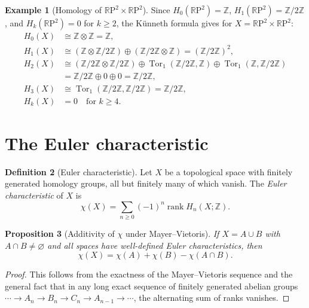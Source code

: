 \documentclass[12pt,a4paper,openany]{book}
\theoremstyle{definition}
\newtheorem{definition}{Definition}[chapter]
\newtheorem{example}[definition]{Example}
\theoremstyle{plain}
\newtheorem{proposition}[definition]{Proposition}
\theoremstyle{remark}
\newcommand{\Z}{\mathbb{Z}}
\newcommand{\RP}{\mathbb{R}\mathrm{P}}
\begin{document}
\begin{example}[Homology of $\RP^2\times\RP^2$]
Since $H_0(\RP^2)=\Z$, $H_1(\RP^2)=\Z/2\Z$, and $H_k(\RP^2)=0$
for $k\geq 2$, the K\"unneth formula gives for $X=\RP^2\times\RP^2$:
\begin{align*}
  H_0(X) &\cong \Z\otimes\Z = \Z,\\
  H_1(X) &\cong (\Z\otimes\Z/2\Z)\oplus(\Z/2\Z\otimes\Z) = (\Z/2\Z)^2,\\
  H_2(X) &\cong (\Z/2\Z\otimes\Z/2\Z)\oplus\operatorname{Tor}_1(\Z/2\Z,\Z)
           \oplus\operatorname{Tor}_1(\Z,\Z/2\Z)\\
         &= \Z/2\Z\oplus 0\oplus 0 = \Z/2\Z,\\
  H_3(X) &\cong \operatorname{Tor}_1(\Z/2\Z,\Z/2\Z) = \Z/2\Z,\\
  H_k(X) &= 0 \quad\text{for } k\geq 4.
\end{align*}
\end{example}

\section{The Euler characteristic}
\label{sec:euler-char}

\begin{definition}[Euler characteristic]
Let $X$ be a topological space with finitely generated homology groups,
all but finitely many of which vanish. The \emph{Euler characteristic}
of $X$ is
\[
  \chi(X) = \sum_{n\geq 0} (-1)^n \operatorname{rank} H_n(X;\Z).
\]
\end{definition}

\begin{proposition}[Additivity of $\chi$ under Mayer--Vietoris]
\label{prop:euler-mv}
If $X=A\cup B$ with $A\cap B\neq\varnothing$ and all spaces have
well-defined Euler characteristics, then
\[
  \chi(X) = \chi(A) + \chi(B) - \chi(A\cap B).
\]
\end{proposition}

\begin{proof}
This follows from the exactness of the Mayer--Vietoris sequence and
the general fact that in any long exact sequence of finitely generated
abelian groups
$\cdots\to A_n\to B_n\to C_n\to A_{n-1}\to\cdots$,
the alternating sum of ranks vanishes.
\end{proof}
\end{document}
